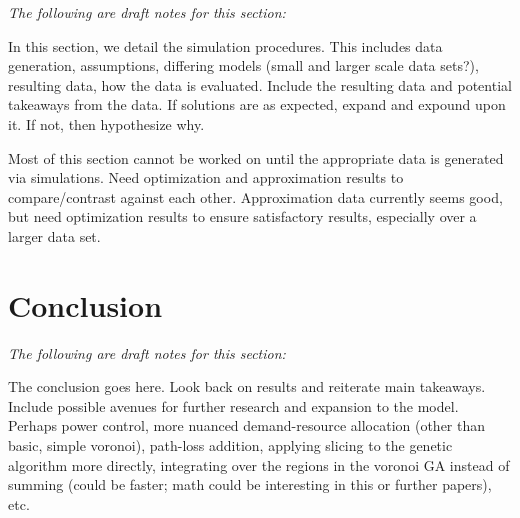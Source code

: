 \documentclass[onecolumn,draftcls]{IEEEtran}
\begin{document}
\noindent {\color{red} \rule{\linewidth}{0.5mm}}

\textit{The following are draft notes for this section:}

In this section, we detail the simulation procedures.  This includes data generation, assumptions, differing models (small and larger scale data sets?), resulting data, how the data is evaluated.  Include the resulting data and potential takeaways from the data.  If solutions are as expected, expand and expound upon it.  If not, then hypothesize why.

Most of this section cannot be worked on until the appropriate data is generated via simulations.  Need optimization and approximation results to compare/contrast against each other.  Approximation data currently seems good, but need optimization results to ensure satisfactory results, especially over a larger data set.

\section{Conclusion} \label{sec:conclusion}

\noindent {\color{red} \rule{\linewidth}{0.5mm}}

\textit{The following are draft notes for this section:}

The conclusion goes here.  Look back on results and reiterate main takeaways.  Include possible avenues for further research and expansion to the model.  Perhaps power control, more nuanced demand-resource allocation (other than basic, simple voronoi), path-loss addition, applying slicing to the genetic algorithm more directly, integrating over the regions in the voronoi GA instead of summing (could be faster; math could be interesting in this or further papers), etc.













\end{document}
